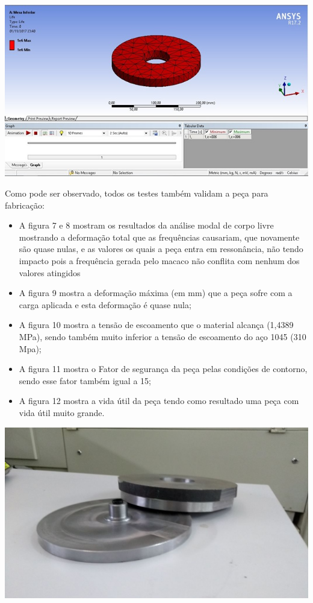     \begin{center}
    	\includegraphics[scale=0.7]{figuras/vida_util_2}
        \label{vida_util_2}
    \end{center}

    Como pode ser observado, todos os testes também validam a peça para fabricação:
    \begin{itemize}
        \item A figura 7 e 8 mostram os resultados da análise modal de corpo livre mostrando a deformação total que as frequências causariam, que novamente são quase nulas, e as valores os quais a peça entra em ressonância, não tendo impacto pois a frequência gerada pelo macaco não conflita com nenhum dos valores atingidos
        \item A figura 9 mostra a deformação máxima (em mm) que a peça sofre com a carga aplicada e esta deformação é quase nula;
        \item A figura 10 mostra a tensão de escoamento que o material alcança (1,4389 MPa), sendo também muito inferior a tensão de escoamento do aço 1045 (310 Mpa);
        \item A figura 11 mostra o Fator de segurança da peça pelas condições de contorno, sendo esse fator também igual a 15;
        \item A figura 12 mostra a vida útil da peça tendo como resultado uma peça com vida útil muito grande.
    \end{itemize}

    \begin{center}
    	\includegraphics[scale=0.7]{figuras/mesa_giratoria_1}
        \label{mesa_giratoria_1}
    \end{center}

